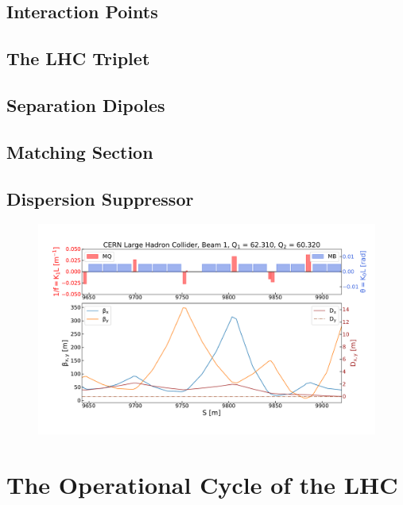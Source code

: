 \subsection{Interaction Points}
\label{subsection:interaction_points}

\subsection{The LHC Triplet}
\label{subsection:lhc_triplet}

\subsection{Separation Dipoles}
\label{subsection:separation_dipoles}

\subsection{Matching Section}
\label{subsection:matching_section}

\subsection{Dispersion Suppressor}
\label{subsection:dispersion_suppressor}

\begin{figure}[!hbt]
  \centering
  \includegraphics*[width=0.9\linewidth]{Figures/Optics_Measurements_Corrections_at_LHC/lhc_dispersion_suppressor.pdf}
  \caption{}
  \label{figure:lhc_dispersion_suppressor}
\end{figure}


\section{The Operational Cycle of the LHC}
\label{section:lhc_operational_cycle}

